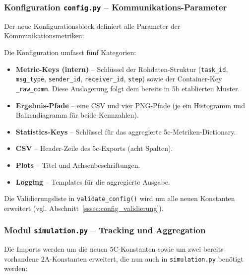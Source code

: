 
\subsubsection{Konfiguration \texttt{config.py} – Kommunikations-Parameter}

Der neue Konfigurationsblock definiert alle Parameter der Kommunikationsmetriken:



Die Konfiguration umfasst fünf Kategorien:

\begin{itemize}
    \item \textbf{Metric-Keys (intern)} -- Schlüssel der Rohdaten-Struktur (\texttt{task\_id}, \texttt{msg\_type}, \texttt{sender\_id}, \texttt{receiver\_id}, \texttt{step}) sowie der Container-Key \texttt{\_raw\_comm}. Diese Auslagerung folgt dem bereits in 5b etablierten Muster.
    \item \textbf{Ergebnis-Pfade} -- eine CSV und vier PNG-Pfade (je ein Histogramm und Balkendiagramm für beide Kennzahlen).
    \item \textbf{Statistics-Keys} -- Schlüssel für das aggregierte 5c-Metriken-Dictionary.
    \item \textbf{CSV} -- Header-Zeile des 5c-Exports (acht Spalten).
    \item \textbf{Plots} -- Titel und Achsenbeschriftungen.
    \item \textbf{Logging} -- Templates für die aggregierte Ausgabe.
\end{itemize}

Die Validierungsliste in \texttt{validate\_config()} wird um alle neuen Konstanten erweitert (vgl. Abschnitt~\ref{sssec:config_validierung}).


\subsubsection{Modul \texttt{simulation.py} – Tracking und Aggregation}

Die Imports werden um die neuen 5C-Konstanten sowie um zwei bereits vorhandene 2A-Konstanten erweitert, die nun auch in \texttt{simulation.py} benötigt werden:

